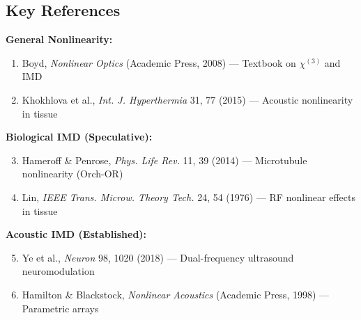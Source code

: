 \subsection{Key References}

\textbf{General Nonlinearity:}
\begin{enumerate}
\item Boyd, \emph{Nonlinear Optics} (Academic Press, 2008) --- Textbook on $\chi^{(3)}$ and IMD
\item Khokhlova et al., \emph{Int. J. Hyperthermia} 31, 77 (2015) --- Acoustic nonlinearity in tissue
\end{enumerate}

\textbf{Biological IMD (Speculative):}
\begin{enumerate}
\setcounter{enumi}{2}
\item Hameroff \& Penrose, \emph{Phys. Life Rev.} 11, 39 (2014) --- Microtubule nonlinearity (Orch-OR)
\item Lin, \emph{IEEE Trans. Microw. Theory Tech.} 24, 54 (1976) --- RF nonlinear effects in tissue
\end{enumerate}

\textbf{Acoustic IMD (Established):}
\begin{enumerate}
\setcounter{enumi}{4}
\item Ye et al., \emph{Neuron} 98, 1020 (2018) --- Dual-frequency ultrasound neuromodulation
\item Hamilton \& Blackstock, \emph{Nonlinear Acoustics} (Academic Press, 1998) --- Parametric arrays
\end{enumerate}

